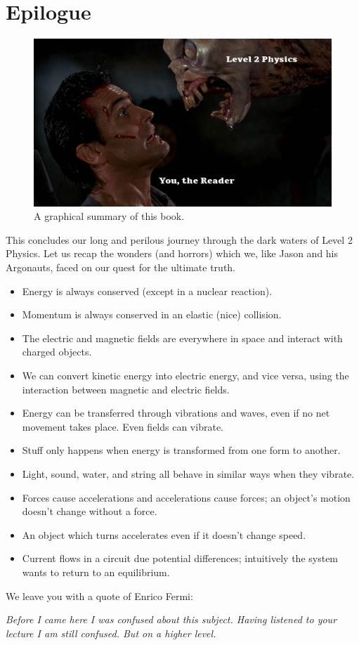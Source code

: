 \documentclass[a4paper]{amsbook}
\newcommand\capcite[1]{}
\begin{document}
\chapter*{Epilogue}
\begin{figure}
  \centering
  \includegraphics[width=\textwidth]{epilogue}
  \caption{A graphical summary of this book. \capcite{https://az616578.vo.msecnd.net/files/responsive/embedded/any/desktop/2017/03/09/636246307083595564943212396_Evil-Dead-2-monster-2.jpg}\label{fig:epilogue}}
\end{figure}
This concludes our long and perilous journey through the dark waters of Level 2 Physics. Let us recap the wonders (and horrors) which we,
like Jason and his Argonauts, faced on our quest for the ultimate truth.

\begin{itemize}
  \item Energy is always conserved (except in a nuclear reaction).
  \item Momentum is always conserved in an elastic (nice) collision.
  \item The electric and magnetic fields are everywhere in space and interact with charged objects.
  \item We can convert kinetic energy into electric energy, and vice versa, using the interaction between magnetic and electric fields.
  \item Energy can be transferred through vibrations and waves, even if no net movement takes place. Even fields can vibrate.
  \item Stuff only happens when energy is transformed from one form to another.
  \item Light, sound, water, and string all behave in similar ways when they vibrate.
  \item Forces cause accelerations and accelerations cause forces; an object's motion doesn't change without a force.
  \item An object which turns accelerates even if it doesn't change speed.
  \item Current flows in a circuit due potential differences; intuitively the system wants to return to an equilibrium.
\end{itemize}

We leave you with a quote of Enrico Fermi:
\begin{center}
  \textit{Before I came here I was confused about this subject. Having listened to your lecture I am still confused. But on a higher level.}
\end{center}
\end{document}
